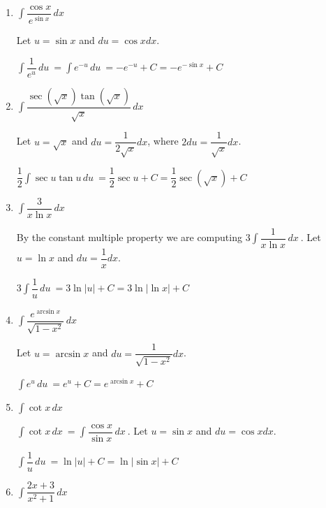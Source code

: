 \documentclass{article}
\begin{document}
\begin{enumerate}
\item $\displaystyle \int \dfrac{\cos x}{e^{\sin x}}\,dx\ $

\begin{solution}
    Let $u=\sin x$ and $du=\cos xdx$.
    
$\displaystyle \int \dfrac{1}{e^u}\,du\ = \displaystyle \int e^{-u}\,du\ = -e^{-u}+C=-e^{-\sin x}+C$
    
\end{solution}
\pspace{\vfill}

\item $\displaystyle \int \dfrac{\sec \left(\sqrt{x}\right)\tan\left(\sqrt{x}\right)}{\sqrt{x}}\,dx\ $

\begin{solution}
    Let $u=\sqrt{x}$ and $du=\dfrac{1}{2\sqrt{x}}dx$, where $2du=\dfrac{1}{\sqrt{x}}dx$.

    $\displaystyle \dfrac{1}{2}\int \sec u \tan u \,du\ = \dfrac{1}{2}\sec u+C = \dfrac{1}{2}\sec (\sqrt{x})+C$
\end{solution}
\pspace{\vfill}

\item $\displaystyle \int \dfrac{3}{x\ln x}\,dx\ $

\begin{solution}
    By the constant multiple property we are computing $\displaystyle 3\int \dfrac{1}{x\ln x}\,dx\ $. Let $u=\ln x$ and $du=\dfrac{1}{x}dx$. 

    $\displaystyle 3\int \dfrac{1}{u}\,du\ =3\ln|u|+C=3\ln|\ln x|+C\ $
\end{solution}
\pspace{\vfill}
\pspace{\newpage}
\item $\displaystyle \int \dfrac{e^{\arcsin x}}{\sqrt{1-x^2}}\,dx\ $

\begin{solution}
    Let $u=\arcsin x$ and $du=\dfrac{1}{\sqrt{1-x^2}}dx$.

    $\displaystyle \int e^u\,du\ =e^u+C=e^{\arcsin x}+C$
\end{solution}
\pspace{\vfill}
\item $\displaystyle \int \cot x \,dx\ $
\begin{solution}
$\displaystyle \int \cot x\,dx\ = \displaystyle \int \dfrac{\cos x}{\sin x} \,dx\ $. Let $u=\sin x$ and $du=\cos xdx$.

$\displaystyle \int \dfrac{1}{u} \,du\ = \ln|u|+C=\ln|\sin x|+C$
\end{solution}

\pspace{\vfill}
\item $\displaystyle \int \dfrac{2x+3}{x^2+1}\,dx\ $


\end{enumerate}
\end{document}
